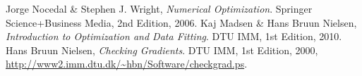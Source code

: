 \begin{thebibliography}{9}

  Jorge Nocedal \& Stephen J. Wright,
  \emph{Numerical Optimization}.
  Springer Science+Business Media,
  2nd Edition,
  2006.
  Kaj Madsen \& Hans Bruun Nielsen,
  \emph{Introduction to Optimization and Data Fitting}.
  DTU IMM,
  1st Edition,
  2010.
  Hans Bruun Nielsen,
  \emph{Checking Gradients}.
  DTU IMM,
  1st Edition,
  2000,
  \url{http://www2.imm.dtu.dk/~hbn/Software/checkgrad.ps}.

\end{thebibliography}
